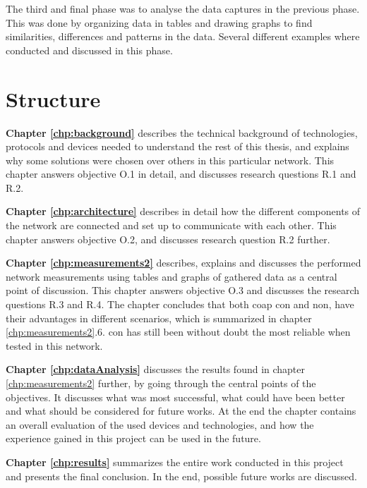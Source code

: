 The third and final phase was to analyse the data captures in the previous phase. This was done by organizing data in tables and drawing graphs to find similarities, differences and patterns in the data. Several different examples where conducted and discussed in this phase. 


\section{Structure}


\noindent \textbf{Chapter \ref{chp:background}} describes the technical background of technologies, protocols and devices needed to understand the rest of this thesis, and explains why some solutions were chosen over others in this particular network. This chapter answers objective O.1 in detail, and discusses research questions R.1 and R.2. 

\noindent \textbf{Chapter \ref{chp:architecture}} describes in detail how the different components of the network are connected and set up to communicate with each other. This chapter answers objective O.2, and discusses research question R.2 further. 

\noindent \textbf{Chapter \ref{chp:measurements2}} describes, explains and discusses the performed network measurements using tables and graphs of gathered data as a central point of discussion. This chapter answers objective O.3 and discusses the research questions R.3 and R.4. The chapter concludes that both \gls{coap} \gls{con} and \gls{non}, have their advantages in different scenarios, which is summarized in chapter \ref{chp:measurements2}.6. \gls{con} has still been without doubt the most reliable when tested in this network. 

\noindent \textbf{Chapter \ref{chp:dataAnalysis}} discusses the results found in chapter \ref{chp:measurements2} further, by going through the central points of the objectives. It discusses what was most successful, what could have been better and what should be considered for future works. At the end the chapter contains an overall evaluation of the used devices and technologies, and how the experience gained in this project can be used in the future. 

\noindent \textbf{Chapter \ref{chp:results}} summarizes the entire work conducted in this project and presents the final conclusion. In the end, possible future works are discussed. 





